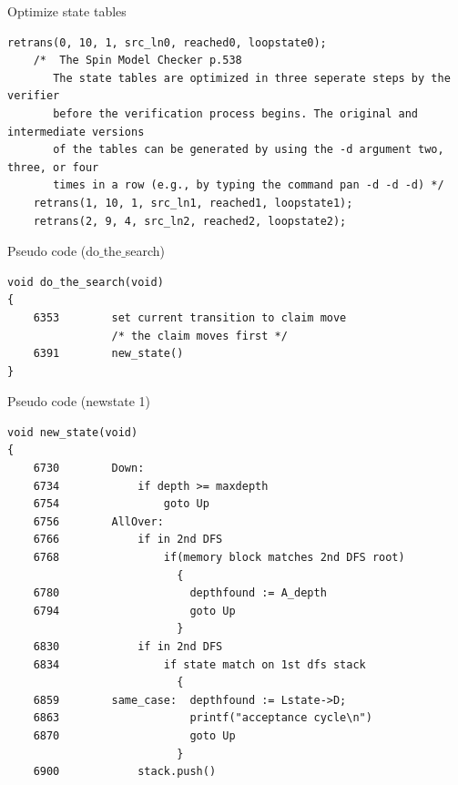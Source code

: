 \documentclass[12pt]{beamer}
\begin{document}
\begin{frame}[fragile]{Optimize state tables}
\begin{lstlisting}[basicstyle=\footnotesize]
    retrans(0, 10, 1, src_ln0, reached0, loopstate0);
    /*  The Spin Model Checker p.538
       The state tables are optimized in three seperate steps by the verifier
       before the verification process begins. The original and intermediate versions
       of the tables can be generated by using the -d argument two, three, or four
       times in a row (e.g., by typing the command pan -d -d -d) */
    retrans(1, 10, 1, src_ln1, reached1, loopstate1);
    retrans(2, 9, 4, src_ln2, reached2, loopstate2);
\end{lstlisting}
\end{frame}

\begin{frame}[fragile]{Pseudo code (do$\_$the$\_$search)}
\begin{lstlisting}[basicstyle=\normalsize]
void do_the_search(void)
{
    6353        set current transition to claim move 
                /* the claim moves first */
    6391        new_state()
}
\end{lstlisting}
\end{frame}

\begin{frame}[fragile]{Pseudo code (newstate 1)}
\begin{lstlisting}[basicstyle=\scriptsize]
void new_state(void)
{
    6730        Down:
    6734            if depth >= maxdepth
    6754                goto Up
    6756        AllOver:
    6766            if in 2nd DFS
    6768                if(memory block matches 2nd DFS root)
                          {
    6780                    depthfound := A_depth
    6794                    goto Up
                          }
    6830            if in 2nd DFS
    6834                if state match on 1st dfs stack
                          {
    6859        same_case:  depthfound := Lstate->D;
    6863                    printf("acceptance cycle\n")
    6870                    goto Up
                          }
    6900            stack.push()
\end{lstlisting}
\end{frame}
\end{document}
